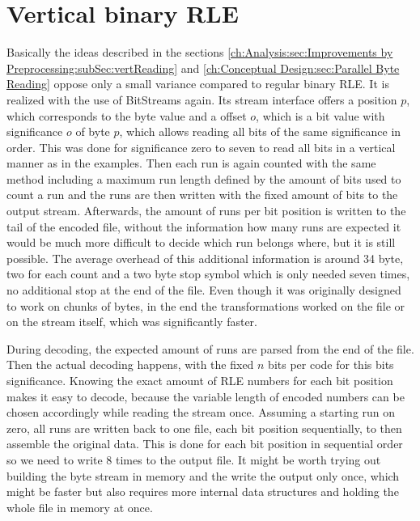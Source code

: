 \section{Vertical binary RLE}
\label{ch:Implementation:vertical rle}
\par{
	Basically the ideas described in the sections \ref{ch:Analysis:sec:Improvements by Preprocessing:subSec:vertReading} and \ref{ch:Conceptual Design:sec:Parallel Byte Reading} oppose only a small variance compared to regular binary RLE. It is realized with the use of BitStreams again. Its stream interface offers a position $p$, which corresponds to the byte value and a offset $o$, which is a bit value with significance $o$ of byte $p$, which allows reading all bits of the same significance in order. This was done for significance zero to seven to read all bits in a vertical manner as in the examples. Then each run is again counted with the same method including a maximum run length defined by the amount of bits used to count a run and the runs are then written with the fixed amount of bits to the output stream. Afterwards, the amount of runs per bit position is written to the tail of the encoded file, without the information how many runs are expected it would be much more difficult to decide which run belongs where, but it is still possible. The average overhead of this additional information is around 34 byte, two for each count and a two byte stop symbol which is only needed seven times, no additional stop at the end of the file. Even though it was originally designed to work on chunks of bytes, in the end the transformations worked on the file or on the stream itself, which was significantly faster.
}
\par{
	During decoding, the expected amount of runs are parsed from the end of the file. Then the actual decoding happens, with the fixed $n$ bits per code for this bits significance. Knowing the exact amount of RLE numbers for each bit position makes it easy to decode, because the variable length of encoded numbers can be chosen accordingly while reading the stream once. Assuming a starting run on zero, all runs are written back to one file, each bit position sequentially, to then assemble the original data. This is done for each bit position in sequential order so we need to write 8 times to the output file. It might be worth trying out building the byte stream in memory and the write the output only once, which might be faster but also requires more internal data structures and holding the whole file in memory at once.
}
